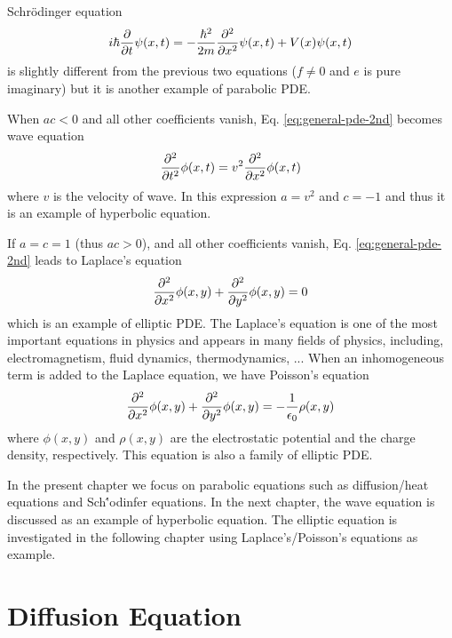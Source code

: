 Schr\"{o}dinger equation
\begin{equation}
	i \hbar \pdv{t} \psi(x,t) = -\frac{\hbar^2}{2m} \pdv[2]{x} \psi(x,t) + V(x) \psi(x,t)
\end{equation}
is slightly different  from the previous two equations ($f \ne 0$ and $e$ is pure imaginary) but it is another example of parabolic PDE.

When $a c <0$ and all other coefficients vanish,  Eq. \eqref{eq:general-pde-2nd} becomes wave equation
\begin{equation}\label{eq:wave-eq}
	\pdv[2]{t}\phi(x,t) = v^2 \pdv[2]{x} \phi(x,t)
\end{equation} 
where $v$ is the velocity of wave.  In this expression $a=v^2$ and $c=-1$ and thus it is an example of hyperbolic equation.

If $a=c=1$ (thus $a c >0$),  and all other coefficients vanish, Eq. \eqref{eq:general-pde-2nd} leads to Laplace's equation
\begin{equation}\label{eq:laplace-eq}
	\pdv[2]{x} \phi(x,y) + \pdv[2]{y} \phi(x,y) = 0
\end{equation}
which is an example of elliptic PDE.  The Laplace's equation is one of the most important equations in physics and appears in many fields of physics, including, electromagnetism, fluid dynamics, thermodynamics, ...
When an inhomogeneous term is added to the Laplace equation, we have Poisson's equation
\begin{equation}\label{eq:poisson-eq}
	\pdv[2]{x} \phi(x,y) + \pdv[2]{y} \phi(x,y) = -\frac{1}{\epsilon_0} \rho(x,y)
\end{equation}
where $\phi(x,y)$ and $\rho(x,y)$ are the electrostatic potential and the charge density, respectively.
This equation is also a family of elliptic PDE.

In the present chapter we focus on parabolic equations such as diffusion/heat equations and Sch\''{o}dinfer equations.  In the next chapter, the wave equation is discussed  as an example of hyperbolic equation.  The elliptic equation
is investigated in the following chapter using Laplace's/Poisson's equations as example.


\section{Diffusion Equation}

